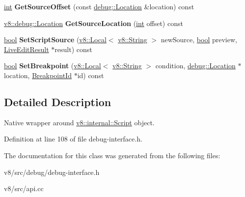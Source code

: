 \begin{DoxyCompactItemize}
\item 
\mbox{\label{classv8_1_1debug_1_1Script_a23188f69a29fc0ab537fa7099113e331}} 
\mbox{\hyperlink{classint}{int}} {\bfseries Get\+Source\+Offset} (const \mbox{\hyperlink{classv8_1_1debug_1_1Location}{debug\+::\+Location}} \&location) const
\item 
\mbox{\label{classv8_1_1debug_1_1Script_afa461505422ce197ab892128d020b9bb}} 
\mbox{\hyperlink{classv8_1_1debug_1_1Location}{v8\+::debug\+::\+Location}} {\bfseries Get\+Source\+Location} (\mbox{\hyperlink{classint}{int}} offset) const
\item 
\mbox{\label{classv8_1_1debug_1_1Script_a002831804fb0370be41cb1513a6aacc5}} 
\mbox{\hyperlink{classbool}{bool}} {\bfseries Set\+Script\+Source} (\mbox{\hyperlink{classv8_1_1Local}{v8\+::\+Local}}$<$ \mbox{\hyperlink{classv8_1_1String}{v8\+::\+String}} $>$ new\+Source, \mbox{\hyperlink{classbool}{bool}} preview, \mbox{\hyperlink{structv8_1_1debug_1_1LiveEditResult}{Live\+Edit\+Result}} $\ast$result) const
\item 
\mbox{\label{classv8_1_1debug_1_1Script_af9f72202729f412488be4eda170a6983}} 
\mbox{\hyperlink{classbool}{bool}} {\bfseries Set\+Breakpoint} (\mbox{\hyperlink{classv8_1_1Local}{v8\+::\+Local}}$<$ \mbox{\hyperlink{classv8_1_1String}{v8\+::\+String}} $>$ condition, \mbox{\hyperlink{classv8_1_1debug_1_1Location}{debug\+::\+Location}} $\ast$location, \mbox{\hyperlink{classint}{Breakpoint\+Id}} $\ast$id) const
\end{DoxyCompactItemize}


\subsection{Detailed Description}
Native wrapper around \mbox{\hyperlink{classv8_1_1internal_1_1Script}{v8\+::internal\+::\+Script}} object. 

Definition at line 108 of file debug-\/interface.\+h.



The documentation for this class was generated from the following files\+:\begin{DoxyCompactItemize}
\item 
v8/src/debug/debug-\/interface.\+h\item 
v8/src/api.\+cc\end{DoxyCompactItemize}
